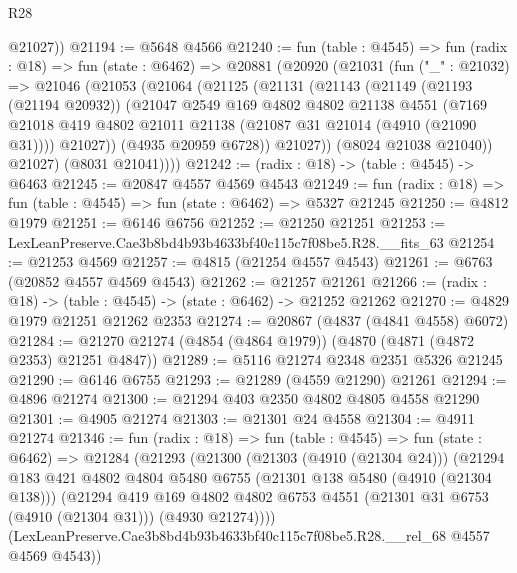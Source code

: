 \begin{lexlean}{R28}
\begin{coremodule}
        @21027))
@21194 := @5648 @4566
@21240 := fun (table : @4545) =>
  fun (radix : @18) =>
  fun (state : @6462) =>
  @20881
    (@20920
      (@21031
        (fun ("_" : @21032) =>
        @21046
          (@21053
            (@21064
              (@21125
                (@21131
                  (@21143
                    (@21149
                      (@21193 (@21194 @20932))
                      (@21047
                        @2549
                        @169
                        @4802
                        @4802
                        @21138
                        @4551
                        (@7169
                          @21018
                          @419
                          @4802
                          @21011
                          @21138
                          (@21087 @31 @21014 (@4910 (@21090 @31))))
                        @21027))
                    (@4935 @20959 @6728))
                  @21027))
              (@8024 @21038 @21040))
            @21027)
          (@8031 @21041))))
@21242 := (radix : @18) -> (table : @4545) -> @6463
@21245 := @20847 @4557 @4569 @4543
@21249 := fun (radix : @18) => fun (table : @4545) => fun (state : @6462) => @5327 @21245
@21250 := @4812 @1979
@21251 := @6146 @6756
@21252 := @21250 @21251
@21253 := LexLeanPreserve.Cae3b8bd4b93b4633bf40c115c7f08be5.R28.__fits_63
@21254 := @21253 @4569
@21257 := @4815 (@21254 @4557 @4543)
@21261 := @6763 (@20852 @4557 @4569 @4543)
@21262 := @21257 @21261
@21266 := (radix : @18) -> (table : @4545) -> (state : @6462) -> @21252 @21262
@21270 := @4829 @1979 @21251 @21262 @2353
@21274 := @20867 (@4837 (@4841 @4558) @6072)
@21284 := @21270 @21274 (@4854 (@4864 @1979)) (@4870 (@4871 (@4872 @2353) @21251 @4847))
@21289 := @5116 @21274 @2348 @2351 @5326 @21245
@21290 := @6146 @6755
@21293 := @21289 (@4559 @21290) @21261
@21294 := @4896 @21274
@21300 := @21294 @403 @2350 @4802 @4805 @4558 @21290
@21301 := @4905 @21274
@21303 := @21301 @24 @4558
@21304 := @4911 @21274
@21346 := fun (radix : @18) =>
  fun (table : @4545) =>
  fun (state : @6462) =>
  @21284
    (@21293
      (@21300
        (@21303 (@4910 (@21304 @24)))
        (@21294
          @183
          @421
          @4802
          @4804
          @5480
          @6755
          (@21301 @138 @5480 (@4910 (@21304 @138)))
          (@21294
            @419
            @169
            @4802
            @4802
            @6753
            @4551
            (@21301 @31 @6753 (@4910 (@21304 @31)))
            (@4930 @21274))))
      (LexLeanPreserve.Cae3b8bd4b93b4633bf40c115c7f08be5.R28.__rel_68 @4557 @4569 @4543))

\end{coremodule}
\end{lexlean}
